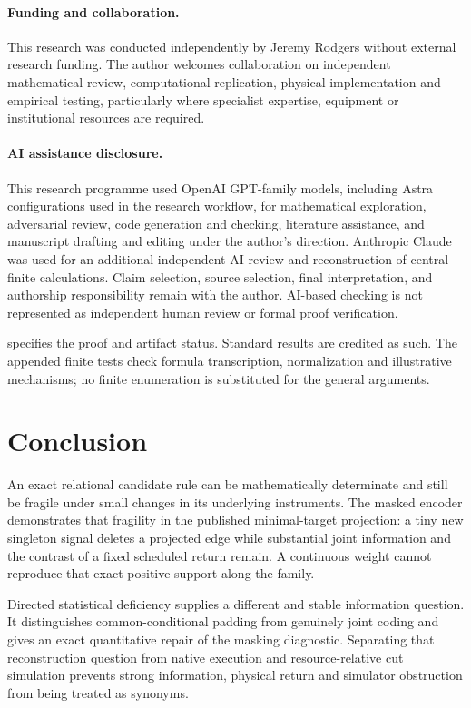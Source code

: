 \paragraph{Funding and collaboration.}
This research was conducted independently by Jeremy Rodgers without external research funding. The author welcomes collaboration on independent mathematical review, computational replication, physical implementation and empirical testing, particularly where specialist expertise, equipment or institutional resources are required.

\paragraph{AI assistance disclosure.}
This research programme used OpenAI GPT-family models, including Astra configurations used in the research workflow, for mathematical exploration, adversarial review, code generation and checking, literature assistance, and manuscript drafting and editing under the author's direction. Anthropic Claude was used for an additional independent AI review and reconstruction of central finite calculations. Claim selection, source selection, final interpretation, and authorship responsibility remain with the author. AI-based checking is not represented as independent human review or formal proof verification.

 specifies the proof and artifact status. Standard results are credited as such. The appended finite tests check formula transcription, normalization and illustrative mechanisms; no finite enumeration is substituted for the general arguments.

\section{Conclusion}\label{sec:conclusion}
An exact relational candidate rule can be mathematically determinate and still be fragile under small changes in its underlying instruments. The masked encoder demonstrates that fragility in the published minimal-target projection: a tiny new singleton signal deletes a projected edge while substantial joint information and the contrast of a fixed scheduled return remain. A continuous weight cannot reproduce that exact positive support along the family.

Directed statistical deficiency supplies a different and stable information question. It distinguishes common-conditional padding from genuinely joint coding and gives an exact quantitative repair of the masking diagnostic. Separating that reconstruction question from native execution and resource-relative cut simulation prevents strong information, physical return and simulator obstruction from being treated as synonyms.

